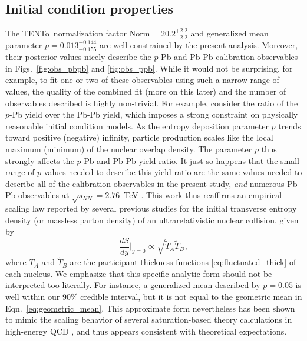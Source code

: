 \documentclass[aps,prc,reprint,amsmath,nofootinbib]{revtex4-1}
\newcommand{\trento}{T\raisebox{-0.5ex}{R}ENTo}
\newcommand{\sqrts}{\sqrt{s_{NN}}}
\newcommand{\T}{\tilde{T}}
\begin{document}
\subsection{Initial condition properties}

The \trento\ normalization factor ${\text{Norm} = 20.2^{+2.2}_{-2.2}}$ and generalized mean parameter $p=0.013^{+0.144}_{-0.155}$ are well constrained by the present analysis.
Moreover, their posterior values nicely describe the $p$-Pb and Pb-Pb calibration observables in Figs.~\ref{fig:obs_pbpb} and \ref{fig:obs_ppb}.
While it would not be surprising, for example, to fit one or two of these observables using such a narrow range of values, the quality of the combined fit (more on this later) and the number of observables described is highly non-trivial.
For example, consider the ratio of the $p$-Pb yield over the Pb-Pb yield, which imposes a strong constraint on physically reasonable initial condition models.
As the entropy deposition parameter $p$ trends toward positive (negative) infinity, particle production scales like the local maximum (minimum) of the nuclear overlap density.
The parameter $p$ thus strongly affects the $p$-Pb and Pb-Pb yield ratio.
It just so happens that the small range of $p$-values needed to describe this yield ratio are the same values needed to describe all of the calibration observables in the present study, \emph{and} numerous Pb-Pb observables at $\sqrts=2.76$~TeV \cite{Bernhard:2018hnz}.
This work thus reaffirms an empirical scaling law reported by several previous studies \cite{Moreland:2014oya, Bernhard:2016tnd, Ke:2016jrd, Bernhard:2018hnz} for the initial transverse entropy density (or massless parton density) of an ultrarelativistic nuclear collision, given by
\begin{equation}
  \label{eq:geometric_mean}
  \frac{dS}{dy}\bigg\vert_{y=0} \propto \sqrt{\T_A \T_B},
\end{equation}
where $\T_A$ and $\T_B$ are the participant thickness functions \eqref{eq:fluctuated_thick} of each nucleus.
We emphasize that this specific analytic form should not be interpreted too literally.
For instance, a generalized mean described by $p=0.05$ is well within our 90\% credible interval, but it is not equal to the geometric mean in Eqn.~\ref{eq:geometric_mean}.
This approximate form nevertheless has been shown to mimic the scaling behavior of several saturation-based theory calculations in high-energy QCD \cite{Bernhard:2016tnd}, and thus appears consistent with theoretical expectations.
\end{document}
